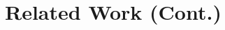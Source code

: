 \documentclass{article}
\begin{document}







\appendix


\section{Related Work (Cont.)}\label{sec:related-work-cont}
\end{document}
